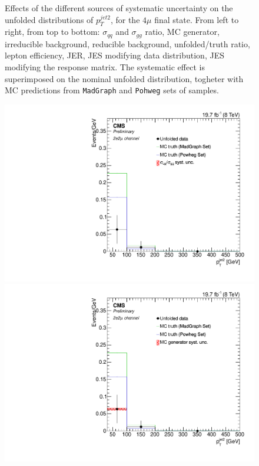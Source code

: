 \begin{figure}[hbtp]
\begin{center}
   \caption{Effects of the different sources of systematic uncertainty on the unfolded distributions of  $p_{T}^{jet2}$, for the     
   $4\mu$ final state. From left to right, from top to bottom: $\sigma_{qq}$ and $\sigma_{gg}$ ratio, MC generator, irreducible background, reducible background, unfolded/truth ratio, lepton efficiency, JER, JES modifying data distribution, JES modifying the response matrix. The systematic effect is superimposed on the nominal unfolded distribution, togheter with MC predictions from \texttt{MadGraph} and \texttt{Pohweg} sets of samples.}
   \label{fig:PtJet2_syst_4m}
 \end{center}
\end{figure}

\begin{figure}[hbtp]
 \begin{center}
   \includegraphics[width=0.8\cmsFigWidth]{Figures/Unfolding/Systematics/ZZTo2e2m_PtJet2_qqgg_Mad_fr}     
   \includegraphics[width=0.8\cmsFigWidth]{Figures/Unfolding/Systematics/ZZTo2e2m_PtJet2_MCgen_Mad_fr}     

\end{center}
\end{figure}

